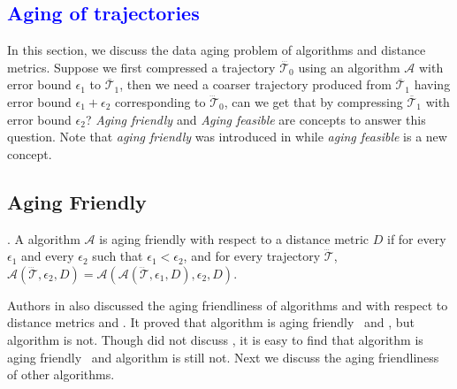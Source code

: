 
\textcolor{blue}{\section{Aging of trajectories}}

In this section, we discuss the data aging problem of \lsa algorithms and distance metrics.
%
Suppose we first compressed a trajectory $\dddot{\mathcal{T}_0}$ using an \lsa algorithm $\mathcal{A}$ with error bound $\epsilon_1$ to $\overline{\mathcal{T}}_1$, then we need a coarser trajectory produced from $\overline{\mathcal{T}}_1$  having error bound $\epsilon_1 + \epsilon_2$ corresponding to $\dddot{\mathcal{T}}_0$, can we get that by compressing $\overline{\mathcal{T}}_1$ with error bound $\epsilon_2$?  \emph{Aging friendly \cite{Cao:Spatio}} and \emph{Aging feasible} are concepts to answer this question. Note that \emph{aging friendly} was introduced in \cite{Cao:Spatio} while \emph{aging feasible} is a new concept.

\subsection{Aging Friendly}
	
. {A \lsa algorithm $\mathcal{A}$ is aging friendly with respect to a distance metric $D$ if for every $\epsilon_1$ and every $\epsilon_2$ such that $\epsilon_1 < \epsilon_2$, and for every trajectory $\dddot{\mathcal{T}}$, $\mathcal{A}(\dddot{\mathcal{T}}, \epsilon_2, D)= \mathcal{A}(\mathcal{A}(\dddot{\mathcal{T}}, \epsilon_1, D), \epsilon_2, D)$.}

	
Authors in \cite{Cao:Spatio} also discussed the aging friendliness of algorithms \opt and \dpa with respect to distance metrics \ped and \sed. It proved that algorithm \dpa is aging friendly \wrt~\ped and \sed, but algorithm \opt is not. 
Though \cite{Cao:Spatio} did not discuss \dad, it is easy to find that algorithm \dpa is aging friendly \wrt~\dad and algorithm \opt is still not. Next we discuss the aging friendliness of other algorithms.


